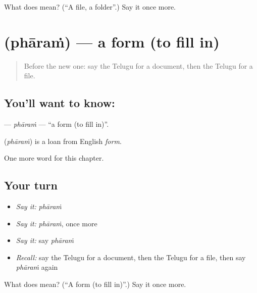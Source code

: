 \begin{tcolorbox}[breakable,colback=teal!4,colframe=teal!35!black,title={Before you move on}]
What does  mean? (\textquotedblleft{}A file, a folder\textquotedblright{}.) Say it once more.
\end{tcolorbox}
\section[\texorpdfstring{\te{ఫారం} (phāraṁ)}{ఫారం (phāraṁ)}]{ (phāraṁ) — a form (to fill in)}

\label{lesson:TE-C226-pharam}



\begin{quote}
Before the new one: say the Telugu for a document, then the Telugu for a file.
\end{quote}

\subsection*{You'll want to know: }
\textbf{} — \emph{phāraṁ} — \textquotedblleft{}a form (to fill in)\textquotedblright{}.

\begin{cousinweb}
\textbf{} (\emph{phāraṁ}) is a loan from English \emph{form}.
\end{cousinweb}

\begin{grammarlens}[title={What you've built}]
One more word for this chapter.
\end{grammarlens}

\subsection*{Your turn}
\begin{itemize}
\raggedright
  \item \emph{Say it:} \emph{phāraṁ}
  \item \emph{Say it:} \emph{phāraṁ}, once more
  \item \emph{Say it:} say \emph{phāraṁ}
  \item \emph{Recall:} say the Telugu for a document, then the Telugu for a file, then say \emph{phāraṁ} again
\end{itemize}

\begin{tcolorbox}[breakable,colback=teal!4,colframe=teal!35!black,title={Before you move on}]
What does  mean? (\textquotedblleft{}A form (to fill in)\textquotedblright{}.) Say it once more.
\end{tcolorbox}
